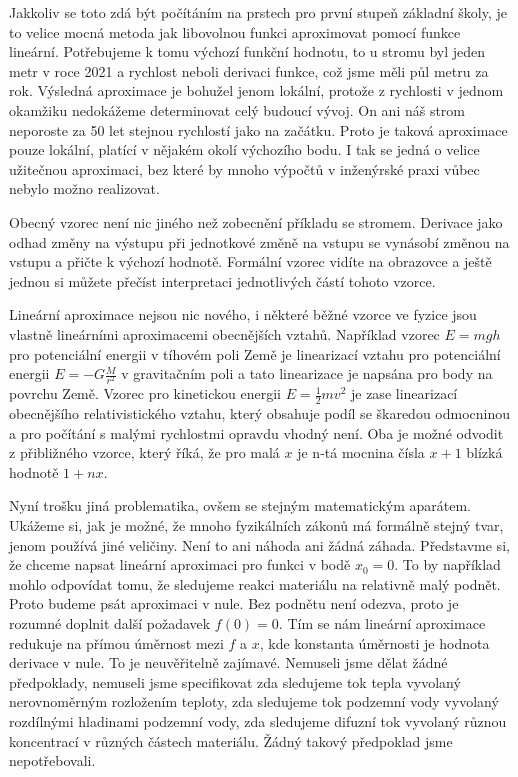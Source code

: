 \documentclass[12pt]{article}
\begin{document}
Jakkoliv se toto zdá být počítáním na prstech pro první stupeň základní školy, je to velice mocná metoda jak libovolnou funkci aproximovat pomocí funkce lineární. Potřebujeme k tomu výchozí funkční hodnotu, to u stromu byl jeden metr v roce 2021 a rychlost neboli derivaci funkce, což jsme měli půl metru za rok. Výsledná aproximace je bohužel jenom lokální, protože z rychlosti v jednom okamžiku nedokážeme determinovat celý budoucí vývoj. On ani náš strom neporoste za 50 let stejnou rychlostí jako na začátku. Proto je taková aproximace pouze lokální, platící v nějakém okolí výchozího bodu. I tak se jedná o velice užitečnou aproximaci, bez které by mnoho výpočtů v inženýrské praxi vůbec nebylo možno realizovat.

Obecný vzorec není nic jiného než zobecnění příkladu se stromem. Derivace jako odhad změny na výstupu při jednotkové změně na vstupu se vynásobí změnou na vstupu a přičte k výchozí hodnotě. Formální vzorec vidíte na obrazovce a ještě jednou si můžete přečíst interpretaci jednotlivých částí tohoto vzorce.

Lineární aproximace nejsou nic nového, i některé běžné vzorce ve fyzice jsou vlastně lineárními aproximacemi obecnějších vztahů. Například vzorec $E=mgh$ pro potenciální energii v tíhovém poli Země je linearizací vztahu pro potenciální energii $E=-G\frac{M}{r^2}$ v gravitačním poli a tato linearizace je napsána pro body na povrchu Země. Vzorec pro kinetickou energii $E=\frac 12 mv^2$ je zase linearizací obecnějšího relativistického vztahu, který obsahuje podíl se škaredou odmocninou a pro počítání s malými rychlostmi opravdu vhodný není. Oba je možné odvodit z přibližného vzorce, který říká, že pro malá $x$ je n-tá mocnina čísla $x+1$ blízká hodnotě $1+nx.$

Nyní trošku jiná problematika, ovšem se stejným matematickým aparátem. Ukážeme si, jak je možné, že mnoho fyzikálních zákonů má formálně stejný tvar, jenom používá jiné veličiny. Není to ani náhoda ani žádná záhada. Představme si, že chceme napsat lineární aproximaci pro funkci v bodě $x_0=0$. To by například mohlo odpovídat tomu, že sledujeme reakci materiálu na relativně malý podnět. Proto budeme psát aproximaci v nule. Bez podnětu není odezva, proto je rozumné doplnit další požadavek $f(0)=0$. Tím se nám lineární aproximace redukuje na přímou úměrnost mezi $f$ a $x$, kde konstanta úměrnosti je hodnota derivace v nule. To je neuvěřitelně zajímavé. Nemuseli jsme dělat žádné předpoklady, nemuseli jsme specifikovat zda sledujeme tok tepla vyvolaný nerovnoměrným rozložením teploty, zda sledujeme tok podzemní vody vyvolaný rozdílnými hladinami podzemní vody, zda sledujeme difuzní tok vyvolaný různou koncentrací v různých částech materiálu. Žádný takový předpoklad jsme nepotřebovali.
\end{document}
